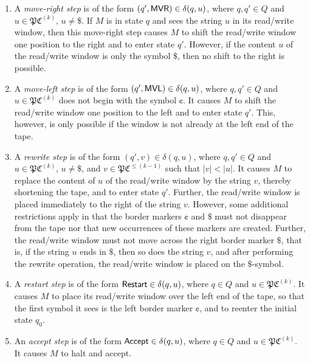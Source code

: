 \begin{enumerate}
\item A \emph{move-right step} is of the form \index{$\MVR$}$(q', \textup{\sf MVR}) \in \delta(q, u)$, where $q, q' \in Q$ and $u \in \mathfrak{PC}^{(k)}$, $u \neq \$$. If $M$ is in state $q$ and sees the string $u$ in its read/write window, then this move-right step causes $M$ to shift the read/write window one position to the right and to enter state $q'$. However, if the content $u$ of the read/write window is only the symbol $\$$, then no shift to the right is possible.
\item A \emph{move-left step} is of the form \index{$\MVL$}$(q', \textup{\sf MVL}) \in \delta(q, u)$, where $q, q' \in Q$ and $u \in \mathfrak{PC}^{(k)}$ does not begin with the symbol $\cent$. It causes $M$ to shift the read/write window one position to the left and to enter state $q'$. This, however, is only possible if the window is not already at the left end of the tape.
\item A \emph{rewrite step} is of the form $(q', v) \in \delta(q, u)$, where $q, q' \in Q$ and $u \in \mathfrak{PC}^{(k)}$, $u \neq \$$, and $v \in \mathfrak{PC}^{\le (k-1)}$ such that $|v| < |u|$. It causes $M$ to replace the content of $u$ of the read/write window by the string $v$, thereby shortening the tape, and to enter state $q'$. Further, the read/write window is placed immediately to the right of the string $v$. However, some additional restrictions apply in that the border markers  $\cent$ and $\$$ must not disappear from the tape nor that new occurrences of these markers are created. Further, the read/write window must not move across the right border marker $\$$, that is, if the string $u$ ends in $\$$, then so does the string $v$, and after performing the rewrite operation, the read/write window is placed on the $\$$-symbol.
\item A \emph{restart step} is of the form \index{$\Restart$}$\textup{\sf Restart} \in \delta(q, u)$, where $q \in Q$ and $u \in \mathfrak{PC}^{(k)}$. It causes $M$ to place its read/write window over the left end of the tape, so that the first symbol it sees is the left border marker $\cent$, and to reenter the initial state $q_0$.
\item An \emph{accept step} is of the form \index{$\Accept$}$\textup{\sf Accept} \in \delta(q, u)$, where $q \in Q$ and $u \in \mathfrak{PC}^{(k)}$. It causes $M$ to halt and accept.
\end{enumerate}

